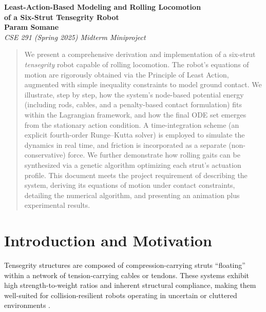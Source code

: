 \documentclass[12pt,letterpaper]{article}
\begin{document}
\begin{center}
    {\Large \textbf{Least-Action-Based Modeling and Rolling Locomotion \\
    of a Six-Strut Tensegrity Robot}}\\[10pt]
    \textbf{Param Somane}\\
    \emph{CSE 291 (Spring 2025) Midterm Miniproject}
\end{center}

\vspace{1em}

\begin{abstract}
\noindent
We present a comprehensive derivation and implementation of a six-strut \emph{tensegrity} robot capable of rolling locomotion. The robot's equations of motion are rigorously obtained via the Principle of Least Action, augmented with simple inequality constraints to model ground contact. We illustrate, step by step, how the system's node-based potential energy (including rods, cables, and a penalty-based contact formulation) fits within the Lagrangian framework, and how the final ODE set emerges from the stationary action condition. A time-integration scheme (an explicit fourth-order Runge--Kutta solver) is employed to simulate the dynamics in real time, and friction is incorporated as a separate (non-conservative) force. We further demonstrate how rolling gaits can be synthesized via a genetic algorithm optimizing each strut's actuation profile. This document meets the project requirement of describing the system, deriving its equations of motion under contact constraints, detailing the numerical algorithm, and presenting an animation plus experimental results.
\end{abstract}

\section{Introduction and Motivation}
Tensegrity structures are composed of compression-carrying struts ``floating'' within a network of tension-carrying cables or tendons. These systems exhibit high strength-to-weight ratios and inherent structural compliance, making them well-suited for collision-resilient robots operating in uncertain or cluttered environments \cite{SkeltonOliveira2014,ZhaWuDimickMueller2024,HiraiImuta2014ICCM,ZhaWuKroegerPerezMueller2020IROS}.
\end{document}
